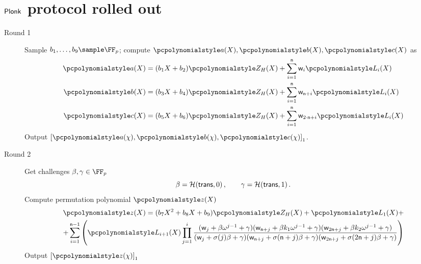 \let\accentvec\vec \documentclass[runningheads,10pt]{llncs}
\begin{document}
\section{$\textnormal{\textsf{Plonk}}$ protocol rolled out}
\label{sec:plonk_explained}
\begin{description}
	\item[Round 1] 
	Sample $b_1, \ldots, b_9 \sample \FF_p$; compute $\p{a}(X), \p{b}(X), \p{c}(X)$ as 
	\begin{align*}
		\p{a}(X) &= (b_1 X + b_2)\p{Z_H}(X) + \sum_{i = 1}^{\numberofconstrains} \wit_i \lag_i(X) \\
		\p{b}(X) &= (b_3 X + b_4)\p{Z_H}(X) + \sum_{i = 1}^{\numberofconstrains} \wit_{\numberofconstrains + i} \lag_i(X) \\
		\p{c}(X) &= (b_5 X + b_6)\p{Z_H}(X) + \sum_{i = 1}^{\numberofconstrains} \wit_{2 \cdot \numberofconstrains + i} \lag_i(X) 
	\end{align*}
	Output $\gone{\p{a}(\chi), \p{b}(\chi), \p{c}(\chi)}$.
	
	\item[Round 2]
	Get challenges $\beta, \gamma \in \FF_p$
	\[
		\beta = \mathcal{H}(\mathsf{trans}, 0)\,, \qquad \gamma = \mathcal{H}(\mathsf{trans}, 1)\,.
	\]
	Compute permutation polynomial $\p{z}(X)$
	\begin{multline*}
		\p{z}(X) = (b_7 X^2 + b_8 X + b_9)\p{Z_H}(X) + \lag_1(X) + \\
			+ \sum_{i = 1}^{\numberofconstrains - 1} 
			\left(\lag_{i + 1} (X) \prod_{j = 1}^{i} 
			\frac{
			(\wit_j +\beta \omega^{j - 1} + \gamma)(\wit_{\numberofconstrains + j} + \beta k_1 \omega^{j - 1} + \gamma)(\wit_{2 \numberofconstrains + j} +\beta k_2 \omega^{j- 1} + \gamma)}
			{(\wit_j+\sigma(j) \beta + \gamma)(\wit_{\numberofconstrains + j} + \sigma(\numberofconstrains + j)\beta + \gamma)(\wit_{2 \numberofconstrains + j} + \sigma(2 \numberofconstrains + j)\beta + \gamma)}\right)
	\end{multline*}
	Output $\gone{\p{z}(\chi)}$
		

\end{description}
\end{document}
